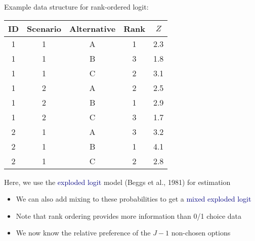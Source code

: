 \documentclass[aspectratio=169]{beamer}
\begin{document}
\begin{frame}

Example data structure for rank-ordered logit:

\bigskip{}

\begin{table}
\centering
\begin{tabular}{ccccc}
\toprule
ID & Scenario & Alternative & Rank & $Z$ \\
\midrule
1 & 1 & A & 1 & 2.3 \\
1 & 1 & B & 3 & 1.8 \\
1 & 1 & C & 2 & 3.1 \\ \midrule
1 & 2 & A & 2 & 2.5 \\
1 & 2 & B & 1 & 2.9 \\
1 & 2 & C & 3 & 1.7 \\\midrule
2 & 1 & A & 3 & 3.2 \\
2 & 1 & B & 1 & 4.1 \\
2 & 1 & C & 2 & 2.8 \\
\bottomrule
\end{tabular}
\end{table}

\bigskip{}


\end{frame}




\begin{frame}

Here, we use the \textcolor{navy}{exploded logit} model (Beggs et al., 1981) for estimation

\bigskip{}


\bigskip{}


\end{frame}

\begin{frame}

\begin{itemize}
\itemsep1.5em
\item<1-> We can also add mixing to these probabilities to get a \textcolor{navy}{mixed exploded logit}
\item<2-> Note that rank ordering provides more information than 0/1 choice data
\item<3-> We now know the relative preference of the $J-1$ non-chosen options
\end{itemize}

\end{frame}
\end{document}
